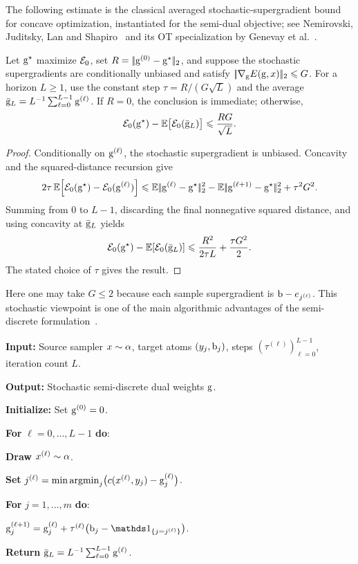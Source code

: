 The following estimate is the classical averaged stochastic-supergradient bound for concave optimization, instantiated for the semi-dual objective; see Nemirovski, Juditsky, Lan and Shapiro~\cite{nemirovski2009robust} and its OT specialization by Genevay et al.~\cite{genevay2016stochastic}.
\begin{prop}\label{prop-semidiscrete-sgd-rate}
	Let $\mathrm{g}^\star$ maximize $\mathcal{E}_0$, set $R=|\!| \mathrm{g}^{(0)}-\mathrm{g}^\star |\!|_2$, and suppose the stochastic supergradients are conditionally unbiased and satisfy $|\!| \nabla_{\mathrm{g}} E(\mathrm{g},x) |\!|_2\leqslant G$. For a horizon $L\geq1$, use the constant step $\tau=R/(G\sqrt L)$ and the average $\bar{\mathrm{g}}_L=L^{-1}\sum_{\ell=0}^{L-1}\mathrm{g}^{(\ell)}$. If $R=0$, the conclusion is immediate; otherwise,
	\[
		\mathcal{E}_0(\mathrm{g}^\star)-\mathbb{E}\bigl[\mathcal{E}_0(\bar{\mathrm{g}}_L)\bigr]
		\leqslant
		\frac{RG}{\sqrt L}.
	\]
\end{prop}
\begin{proof}
	Conditionally on $\mathrm{g}^{(\ell)}$, the stochastic supergradient is unbiased. Concavity and the squared-distance recursion give
	\[
		2\tau\,\mathbb{E}\!\left[\mathcal{E}_0(\mathrm{g}^\star)-\mathcal{E}_0(\mathrm{g}^{(\ell)})\right]
		\leqslant
		\mathbb{E}|\!| \mathrm{g}^{(\ell)}-\mathrm{g}^\star |\!|_2^2
		-
		\mathbb{E}|\!| \mathrm{g}^{(\ell+1)}-\mathrm{g}^\star |\!|_2^2
		+
		\tau^2G^2.
	\]
	Summing from $0$ to $L-1$, discarding the final nonnegative squared distance, and using concavity at $\bar{\mathrm{g}}_L$ yields
	\[
		\mathcal{E}_0(\mathrm{g}^\star)-\mathbb{E}\!\left[\mathcal{E}_0(\bar{\mathrm{g}}_L)\right]
		\leqslant
		\frac{R^2}{2\tau L}+\frac{\tau G^2}{2}.
	\]
	The stated choice of $\tau$ gives the result.
\end{proof}

Here one may take $G\leq2$ because each sample supergradient is $\mathrm{b}-e_{j^{(\ell)}}$. This stochastic viewpoint is one of the main algorithmic advantages of the semi-discrete formulation~\cite{Merigot11,genevay2016stochastic}.

\begin{alg}\label{alg:semidiscrete-stochastic-ascent}
\textbf{Input:} Source sampler $x\sim\alpha$, target atoms $(y_j,\mathrm{b}_j)$, steps $(\tau^{(\ell)})_{\ell=0}^{L-1}$, iteration count $L$.

\textbf{Output:} Stochastic semi-discrete dual weights $\mathrm{g}$.

\textbf{Initialize:} Set $\mathrm{g}^{(0)}=0$.

\textbf{For} $\ell=0,\ldots,L-1$ \textbf{do}:
\begin{algblock}

\textbf{Draw} $x^{(\ell)}\sim\alpha$.

\textbf{Set} \(j^{(\ell)}=\min\operatorname{argmin}_j\bigl(c(x^{(\ell)},y_j)-\mathrm{g}_j^{(\ell)}\bigr)\).

\textbf{For} $j=1,\ldots,m$ \textbf{do}:
\begin{algblock}
\(\gD_j^{(\ell+1)} = \gD_j^{(\ell)} + \tau^{(\ell)}\bigl(\b_j-\ones_{\{j=j^{(\ell)}\}}\bigr)\).
\end{algblock}
\end{algblock}
\algreturnskip
\textbf{Return} $\bar{\mathrm{g}}_L=L^{-1}\sum_{\ell=0}^{L-1}\mathrm{g}^{(\ell)}$.
\end{alg}


